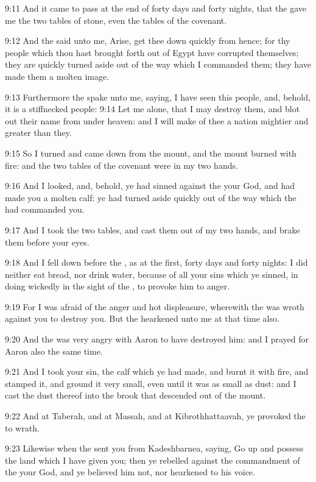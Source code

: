 9:11 And it came to pass at the end of forty days and forty nights, that the \LORD gave me the two tables of stone, even the tables of the covenant.

9:12 And the \LORD said unto me, Arise, get thee down quickly from hence; for thy people which thou hast brought forth out of Egypt have corrupted themselves; they are quickly turned aside out of the way which I commanded them; they have made them a molten image.

9:13 Furthermore the \LORD spake unto me, saying, I have seen this people, and, behold, it is a stiffnecked people: 9:14 Let me alone, that I may destroy them, and blot out their name from under heaven: and I will make of thee a nation mightier and greater than they.

9:15 So I turned and came down from the mount, and the mount burned with fire: and the two tables of the covenant were in my two hands.

9:16 And I looked, and, behold, ye had sinned against the \LORD your God, and had made you a molten calf: ye had turned aside quickly out of the way which the \LORD had commanded you.

9:17 And I took the two tables, and cast them out of my two hands, and brake them before your eyes.

9:18 And I fell down before the \LORD, as at the first, forty days and forty nights: I did neither eat bread, nor drink water, because of all your sins which ye sinned, in doing wickedly in the sight of the \LORD, to provoke him to anger.

9:19 For I was afraid of the anger and hot displeasure, wherewith the \LORD was wroth against you to destroy you. But the \LORD hearkened unto me at that time also.

9:20 And the \LORD was very angry with Aaron to have destroyed him: and I prayed for Aaron also the same time.

9:21 And I took your sin, the calf which ye had made, and burnt it with fire, and stamped it, and ground it very small, even until it was as small as dust: and I cast the dust thereof into the brook that descended out of the mount.

9:22 And at Taberah, and at Massah, and at Kibrothhattaavah, ye provoked the \LORD to wrath.

9:23 Likewise when the \LORD sent you from Kadeshbarnea, saying, Go up and possess the land which I have given you; then ye rebelled against the commandment of the \LORD your God, and ye believed him not, nor hearkened to his voice.

